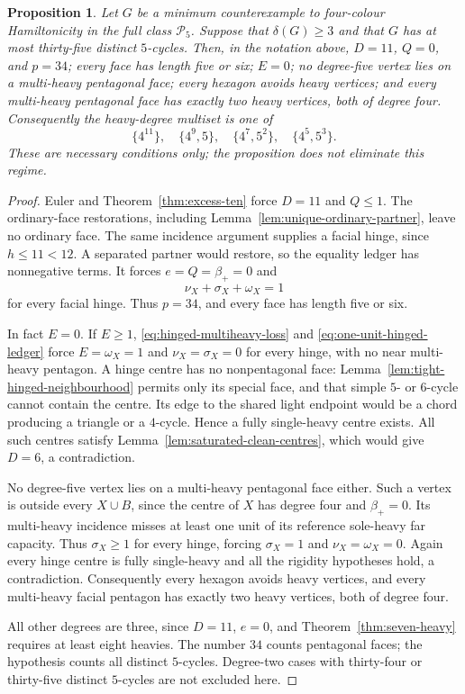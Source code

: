 \documentclass[11pt]{article}
\newtheorem{proposition}[theorem]{Proposition}
\theoremstyle{remark}
\numberwithin{equation}{section}
\numberwithin{table}{section}
\begin{document}
\begin{proposition}\label{prop:thirty-five-frontier}
Let $G$ be a minimum counterexample to four-colour Hamiltonicity in
the full class $\mathcal P_5$.  Suppose that $\delta(G)\ge3$ and that
$G$ has at most thirty-five distinct $5$-cycles.  Then, in the notation
above, $D=11$, $Q=0$, and $p=34$; every face has length five or six;
$E=0$; no degree-five vertex lies on a multi-heavy pentagonal face;
every hexagon avoids heavy vertices; and every multi-heavy pentagonal
face has exactly two heavy vertices, both of degree four.  Consequently
the heavy-degree multiset is one of
\[
 \{4^{11}\},\quad \{4^9,5\},\quad
 \{4^7,5^2\},\quad \{4^5,5^3\}.
\]
These are necessary conditions only; the proposition does not eliminate
this regime.
\end{proposition}
\begin{proof}
Euler and Theorem~\ref{thm:excess-ten} force $D=11$ and $Q\le1$.
The ordinary-face restorations, including
Lemma~\ref{lem:unique-ordinary-partner}, leave no ordinary face.
The same incidence argument supplies a facial hinge, since $h\le11<12$.
A separated partner would restore, so the equality ledger has
nonnegative terms. It forces $e=Q=\beta_+=0$ and
\begin{equation}\label{eq:one-unit-hinged-ledger}
 \nu_X+\sigma_X+\omega_X=1
\end{equation}
for every facial hinge. Thus $p=34$, and every face has length five
or six.

In fact $E=0$. If $E\ge1$,
\eqref{eq:hinged-multiheavy-loss} and
\eqref{eq:one-unit-hinged-ledger} force
$E=\omega_X=1$ and $\nu_X=\sigma_X=0$ for every hinge, with no
near multi-heavy pentagon. A hinge centre has no nonpentagonal face:
Lemma~\ref{lem:tight-hinged-neighbourhood} permits only its special
face, and that simple $5$- or $6$-cycle cannot contain the centre.
Its edge to the shared light endpoint would be a chord producing a
triangle or a $4$-cycle. Hence a fully single-heavy centre exists.
All such centres satisfy Lemma~\ref{lem:saturated-clean-centres},
which would give $D=6$, a contradiction.

No degree-five vertex lies on a multi-heavy pentagonal face either.
Such a vertex is outside every $X\cup B$, since the centre of $X$
has degree four and $\beta_+=0$. Its multi-heavy incidence misses
at least one unit of its reference sole-heavy far capacity. Thus
$\sigma_X\ge1$ for every hinge, forcing
$\sigma_X=1$ and $\nu_X=\omega_X=0$. Again every hinge centre is
fully single-heavy and all the rigidity hypotheses hold, a contradiction.
Consequently every hexagon avoids heavy vertices, and every multi-heavy
facial pentagon has exactly two heavy vertices, both of degree four.

All other degrees are three, since $D=11$, $e=0$, and
Theorem~\ref{thm:seven-heavy} requires at least eight heavies.
The number $34$ counts pentagonal faces; the hypothesis counts all
distinct $5$-cycles. Degree-two cases with thirty-four or thirty-five
distinct $5$-cycles are not excluded here.
\end{proof}
\end{document}

